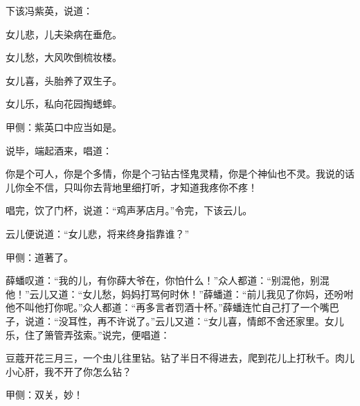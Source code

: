 \begin{parag}
    下该冯紫英，说道：
\end{parag}


\begin{poem}
    \begin{pl}女儿悲，儿夫染病在垂危。\end{pl}

    \begin{pl}女儿愁，大风吹倒梳妆楼。\end{pl}

    \begin{pl}女儿喜，头胎养了双生子。\end{pl}

    \begin{pl}女儿乐，私向花园掏蟋蟀。\end{pl}\begin{note}甲侧：紫英口中应当如是。\end{note}
\end{poem}


\begin{parag}
    说毕，端起酒来，唱道：
\end{parag}


\begin{qute2sp}
    \begin{poem}
        \begin{pl}你是个可人，你是个多情，你是个刁钻古怪鬼灵精，你是个神仙也不灵。我说的话儿你全不信，只叫你去背地里细打听，才知道我疼你不疼！\end{pl}
    \end{poem}
\end{qute2sp}


\begin{parag}
    唱完，饮了门杯，说道：“鸡声茅店月。”令完，下该云儿。
\end{parag}


\begin{parag}
    云儿便说道：“女儿悲，将来终身指靠谁？”\begin{note}甲侧：道著了。\end{note}薛蟠叹道：“我的儿，有你薛大爷在，你怕什么！”众人都道：“别混他，别混他！”云儿又道：“女儿愁，妈妈打骂何时休！”薛蟠道：“前儿我见了你妈，还吩咐他不叫他打你呢。”众人都道：“再多言者罚酒十杯。”薛蟠连忙自己打了一个嘴巴子，说道：“没耳性，再不许说了。”云儿又道：“女儿喜，情郎不舍还家里。女儿乐，住了箫管弄弦索。”说完，便唱道：
\end{parag}

\begin{qute2sp}
    \begin{poem}
        \begin{pl}豆蔻开花三月三，一个虫儿往里钻。钻了半日不得进去，爬到花儿上打秋千。肉儿小心肝，我不开了你怎么钻？\end{pl}
        \begin{note}甲侧：双关，妙！\end{note}
    \end{poem}
\end{qute2sp}


